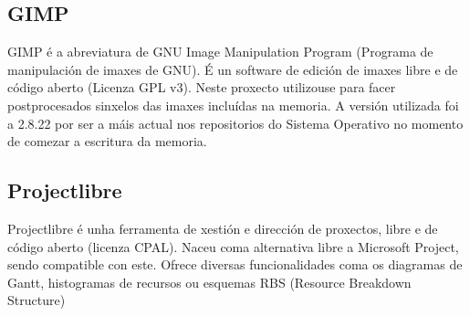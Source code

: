 \subsection{GIMP}

GIMP é a abreviatura de GNU Image Manipulation Program (Programa de manipulación de imaxes de GNU). É un software de edición de imaxes libre e de código aberto (Licenza GPL v3\cite{gimp}). Neste proxecto utilizouse para facer postprocesados sinxelos das imaxes incluídas na memoria. A versión utilizada foi a 2.8.22 por ser a máis actual nos repositorios do Sistema Operativo no momento de comezar a escritura da memoria.

\subsection{Projectlibre}

Projectlibre é unha ferramenta de xestión e dirección de proxectos, libre e de código aberto (licenza CPAL\cite{projectlibre}). Naceu coma alternativa libre a Microsoft Project, sendo compatible con este. Ofrece diversas funcionalidades coma os diagramas de Gantt, histogramas de recursos ou esquemas RBS (Resource Breakdown Structure) 
